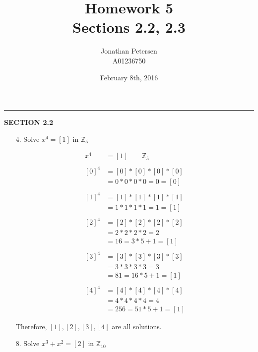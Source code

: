 \documentclass{article}
\title{Homework 5 \\ Sections 2.2, 2.3}
\author{Jonathan Petersen \\ A01236750}
\date{February 8th, 2016}
\begin{document}
	\maketitle
	\hrule 
	\vspace{5mm}
	\textbf{SECTION 2.2} \\
	\begin{enumerate}
		\item [4.] Solve $x^4 = [1]$ in $\mathbb{Z}_5$

			\begin{align*}
				x^4 & = [1] \qquad \mathbb{Z}_5 \\
				& \\
				[0]^4 & = [0] * [0] * [0] * [0] \\
					& = 0 * 0 * 0 * 0 = 0 = [0] \\
					& \\
				[1]^4 & = [1] * [1] * [1] * [1] \\
					& = 1 * 1 * 1 * 1 = 1 = [1] \\
					& \\
				[2]^4 & = [2] * [2] * [2] * [2] \\
					& = 2 * 2 * 2 * 2 = 2 \\
					& = 16 = 3 * 5 + 1 = [1] \\
					& \\
				[3]^4 & = [3] * [3] * [3] * [3] \\
					& = 3 * 3 * 3 * 3 = 3 \\
					& = 81 = 16 * 5 + 1 = [1] \\
					& \\
				[4]^4 & = [4] * [4] * [4] * [4] \\
					& = 4 * 4 * 4 * 4 = 4 \\
					& = 256 = 51 * 5 + 1 = [1]
			\end{align*}

			Therefore, $[1], [2], [3], [4]$ are all solutions.

		\item [8.] Solve $x^3 + x^2 = [2]$ in $\mathbb{Z}_{10}$


\end{enumerate}
\end{document}
